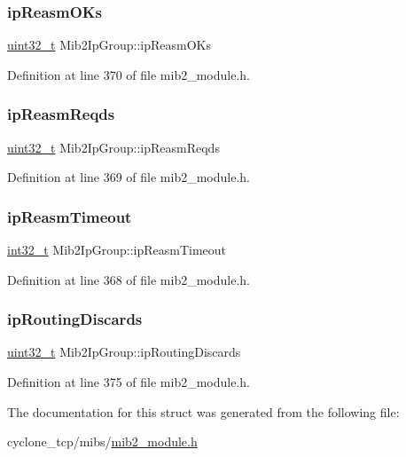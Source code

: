 \subsubsection{\texorpdfstring{ip\+Reasm\+O\+Ks}{ipReasmOKs}}
{\footnotesize\ttfamily \hyperlink{stdint_8h_a435d1572bf3f880d55459d9805097f62}{uint32\+\_\+t} Mib2\+Ip\+Group\+::ip\+Reasm\+O\+Ks}



Definition at line 370 of file mib2\+\_\+module.\+h.

\mbox{\label{structMib2IpGroup_a01b23a17d3b324f2c8b5a9bf5af07970}} 
\subsubsection{\texorpdfstring{ip\+Reasm\+Reqds}{ipReasmReqds}}
{\footnotesize\ttfamily \hyperlink{stdint_8h_a435d1572bf3f880d55459d9805097f62}{uint32\+\_\+t} Mib2\+Ip\+Group\+::ip\+Reasm\+Reqds}



Definition at line 369 of file mib2\+\_\+module.\+h.

\mbox{\label{structMib2IpGroup_a12b7f36fd1a5a87f313afc38e1afec09}} 
\subsubsection{\texorpdfstring{ip\+Reasm\+Timeout}{ipReasmTimeout}}
{\footnotesize\ttfamily \hyperlink{stdint_8h_ab1967d8591af1a4e48c37fd2b0f184d0}{int32\+\_\+t} Mib2\+Ip\+Group\+::ip\+Reasm\+Timeout}



Definition at line 368 of file mib2\+\_\+module.\+h.

\mbox{\label{structMib2IpGroup_a01af1a9f05e5883691cd5c6dacfbe2d1}} 
\subsubsection{\texorpdfstring{ip\+Routing\+Discards}{ipRoutingDiscards}}
{\footnotesize\ttfamily \hyperlink{stdint_8h_a435d1572bf3f880d55459d9805097f62}{uint32\+\_\+t} Mib2\+Ip\+Group\+::ip\+Routing\+Discards}



Definition at line 375 of file mib2\+\_\+module.\+h.



The documentation for this struct was generated from the following file\+:\begin{DoxyCompactItemize}
\item 
cyclone\+\_\+tcp/mibs/\hyperlink{mib2__module_8h}{mib2\+\_\+module.\+h}\end{DoxyCompactItemize}
